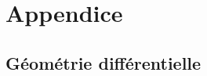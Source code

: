 \documentclass{article}
\theoremstyle{definition}
\newcommand{\Z}{\mathbb Z}
\newcommand{\R}{\mathbb R}
\begin{document}


\section{Appendice}

\subsection{Géométrie différentielle}



 
\nocite{*}
\end{document}
